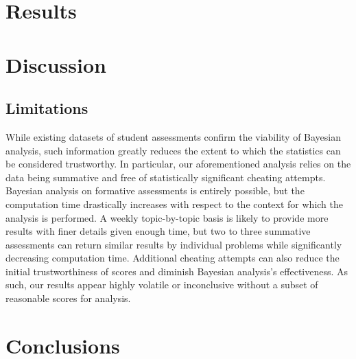 \documentclass[review,sigconf]{acmart}
\begin{document}
\section{Results}

\section{Discussion}
\subsection{Limitations}
While existing datasets of student assessments confirm the viability of Bayesian analysis, such information greatly reduces the extent to which
the statistics can be considered trustworthy. In particular, our aforementioned analysis relies on the data being summative and free of
statistically significant cheating attempts. Bayesian analysis on formative assessments is entirely possible, but the computation time drastically
increases with respect to the context for which the analysis is performed. A weekly topic-by-topic basis is likely to provide more results with finer
details given enough time, but two to three summative assessments can return similar results by individual problems while significantly decreasing
computation time. Additional cheating attempts can also reduce the initial trustworthiness of scores and diminish Bayesian analysis's effectiveness.
As such, our results appear highly volatile or inconclusive without a subset of reasonable scores for analysis. 

\section{Conclusions}




\end{document}
